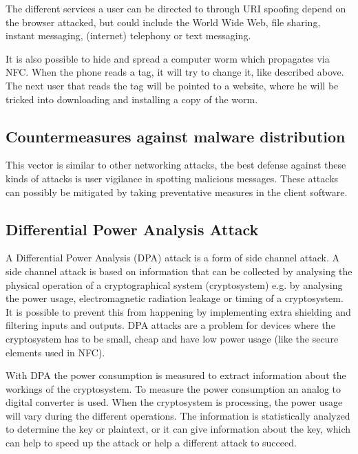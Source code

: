 The different services a user can be directed to through URI spoofing depend on the browser attacked, but could include the World Wide Web, file sharing, instant messaging, (internet) telephony or text messaging.

It is also possible to hide and spread a computer worm which propagates via NFC.
When the phone reads a tag, it will try to change it, like described above.
The next user that reads the tag will be pointed to a website, where he will be tricked into downloading and installing a copy of the worm.
\cite{rieback2006your}

\subsection{Countermeasures against malware distribution}
This vector is similar to other networking attacks, the best defense against these kinds of attacks is user vigilance in spotting malicious messages.
These attacks can possibly be mitigated by taking preventative measures in the client software.

\subsection{Differential Power Analysis Attack}
A Differential Power Analysis (DPA) attack is a form of side channel attack.
A side channel attack is based on information that can be collected by analysing the physical operation of a cryptographical system (cryptosystem) e.g. by analysing the power usage, electromagnetic radiation leakage or timing of a cryptosystem.
It is possible to prevent this from happening by implementing extra shielding and filtering inputs and outputs.
DPA attacks are a problem for devices where the cryptosystem has to be small, cheap and have low power usage (like the secure elements used in NFC).

With DPA the power consumption is measured to extract information about the workings of the cryptosystem.
To measure the power consumption an analog to digital converter is used.
When the cryptosystem is processing, the power usage will vary during the different operations.
The information is statistically analyzed to determine the key or plaintext, or it can give information about the key, which can help to speed up the attack or help a different attack to succeed. %

